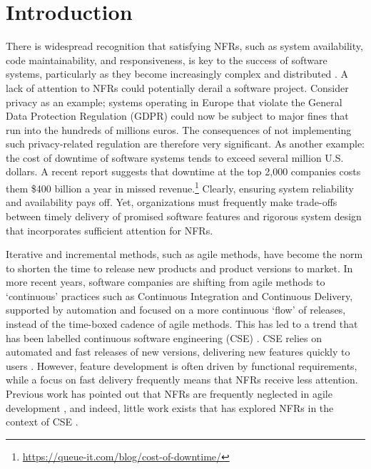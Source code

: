 \documentclass[smallextended]{svjour3}        %
\providecommand{\DIFaddend}{} %
\DeclareRobustCommand{\DIFaddend}{\DIFOaddend \let\includegraphics\DIFOincludegraphics} %
\begin{document}
\DIFaddend \section{Introduction}\label{sec:introduction}
There is widespread recognition that satisfying NFRs, such as system availability, code maintainability, and responsiveness, is key to the success of software systems, particularly as they become increasingly complex and distributed \citep{wiegers2013software, glinz_non-functional_2007,caracciolo2014software,mairiza2010investigation}. 
A lack of attention to NFRs could potentially derail a software project. Consider privacy as an example; systems operating in Europe that violate the General Data Protection Regulation (GDPR) could now be subject to major fines that run into the hundreds of millions euros. 
The consequences of not implementing such privacy-related regulation are therefore very significant. As another example: the cost of downtime of software systems tends to exceed several million U.S. dollars. 
A recent report suggests that downtime at the top 2,000 companies costs them \$400 billion a year in missed revenue.\footnote{\url{https://queue-it.com/blog/cost-of-downtime/}} Clearly, ensuring system reliability and availability pays off. 
Yet, organizations must frequently make trade-offs between timely delivery of promised software features and rigorous system design that incorporates sufficient attention for NFRs.

Iterative and incremental methods, such as agile methods, have become the norm to shorten the time to release new products and product versions to market. In more recent years, software companies are shifting from agile methods to `continuous' practices such as Continuous Integration and Continuous Delivery, supported by automation and focused on a more continuous `flow' of releases, instead of the time-boxed cadence of agile methods. This has led to a trend that has been labelled continuous software engineering (CSE) \citep{fitzgerald2017continuous,bosch2014continuous,klotins2023continuous}.
CSE relies on automated and fast releases of new versions, delivering new features quickly to users \citep{gralha_evolution_2018,klotins2023continuous}. 
However, feature development is often driven by functional requirements, while a focus on fast delivery frequently means that NFRs receive less attention. Previous work has pointed out that NFRs are frequently neglected in agile development \citep{ramesh_agile_2010}, and indeed, little work exists that has explored NFRs in the context of CSE \citep{behutiye_non-functional_2017}.
\end{document}
